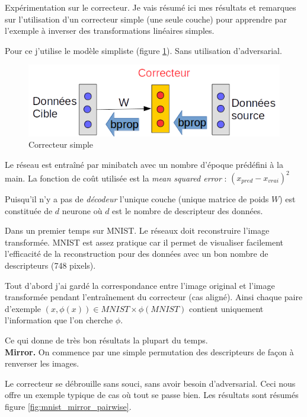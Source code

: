 

Expérimentation sur le correcteur. Je vais résumé ici mes résultats et remarques
sur l'utilisation d'un correcteur simple (une seule couche) pour apprendre par l'exemple
à inverser des transformations linéaires simples.

Pour ce j'utilise le modèle simpliste (figure \ref{fig:correcteur}). 
Sans utilisation d'adversarial.

\begin{figure}[H] %
\centering
\includegraphics[width=0.45\linewidth]{fig/05-04-2016/Correcteur.png}
\caption{Correcteur simple}
\label{fig:correcteur}
\end{figure}

Le réseau est entraîné par minibatch avec un nombre d'époque prédéfini à la main.
La fonction de coût utilisée est la \emph{mean squared error} : $(x_{pred}-x_{vrai})^2$

Puisqu'il n'y a pas de \emph{décodeur} l'unique couche (unique matrice de poids $W$)
est constituée de $d$ neurone où $d$ est le nombre de descripteur des données.



Dans un premier temps sur MNIST.
Le réseaux doit reconstruire l'image transformée.
MNIST est assez pratique car il permet de visualiser facilement l'efficacité 
de la reconstruction pour des données avec un bon nombre de descripteurs (748 pixels).


Tout d'abord j'ai gardé la correspondance entre l'image original et
l'image transformée pendant l'entraînement du correcteur (cas aligné).
Ainsi chaque paire d'exemple $(x, \phi(x)) \in MNIST\times \phi(MNIST)$
contient uniquement l'information que l'on cherche $\phi$.

Ce qui donne de très bon résultats la plupart du temps.\\


{\Large\textbf{Mirror.}} On commence par une simple permutation des 
descripteurs de façon à renverser les images.

Le correcteur se débrouille sans souci, sans avoir besoin d'adversarial. Ceci
nous offre un exemple typique de cas où tout se passe bien. Les résultats sont résumés
figure \ref{fig:mnist_mirror_pairwise}.

